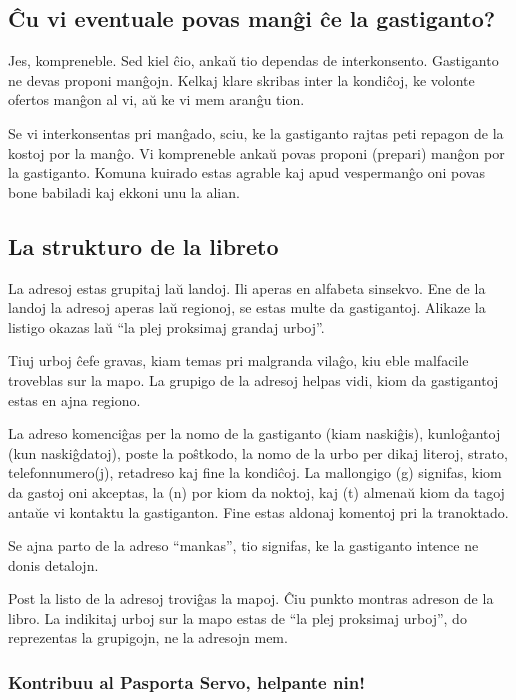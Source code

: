 {\subsection{Ĉu vi eventuale povas manĝi ĉe la gastiganto?}

Jes, kompreneble. Sed kiel ĉio, ankaŭ tio dependas de interkonsento.
Gastiganto ne devas proponi manĝojn. Kelkaj klare skribas inter la
kondiĉoj, ke volonte ofertos manĝon al vi, aŭ ke vi mem aranĝu tion.

Se vi interkonsentas pri manĝado, sciu, ke la gastiganto rajtas peti
repagon de la kostoj por la manĝo. Vi kompreneble ankaŭ povas proponi
(prepari) manĝon por la gastiganto. Komuna kuirado estas agrable kaj
apud vespermanĝo oni povas bone babiladi kaj ekkoni unu la alian.

\subsection{La strukturo de la libreto}

La adresoj estas grupitaj laŭ landoj. Ili aperas en alfabeta sinsekvo.
Ene de la landoj la adresoj aperas laŭ regionoj, se estas multe da
gastigantoj. Alikaze la listigo okazas laŭ ``la plej proksimaj grandaj
urboj''.

Tiuj urboj ĉefe gravas, kiam temas pri malgranda vilaĝo, kiu eble
malfacile troveblas sur la mapo. La grupigo de la adresoj helpas vidi,
kiom da gastigantoj estas en ajna regiono.

La adreso komenciĝas per la nomo de la gastiganto (kiam naskiĝis),
kunloĝantoj (kun naskiĝdatoj), poste la poŝtkodo, la nomo de la urbo per
dikaj literoj, strato, telefonnumero(j), retadreso kaj fine la kondiĉoj.
La mallongigo (g) signifas, kiom da gastoj oni akceptas, la (n) por kiom
da noktoj, kaj (t) almenaŭ kiom da tagoj antaŭe vi kontaktu la
gastiganton. Fine estas aldonaj komentoj pri la tranoktado.

Se ajna parto de la adreso ``mankas'', tio signifas, ke la gastiganto
intence ne donis detalojn.

Post la listo de la adresoj troviĝas la mapoj. Ĉiu punkto montras
adreson de la libro. La indikitaj urboj sur la mapo estas de ``la plej
proksimaj urboj'', do reprezentas la grupigojn, ne la adresojn mem.

\subsubsection{Kontribuu al Pasporta Servo, helpante nin!}

}
